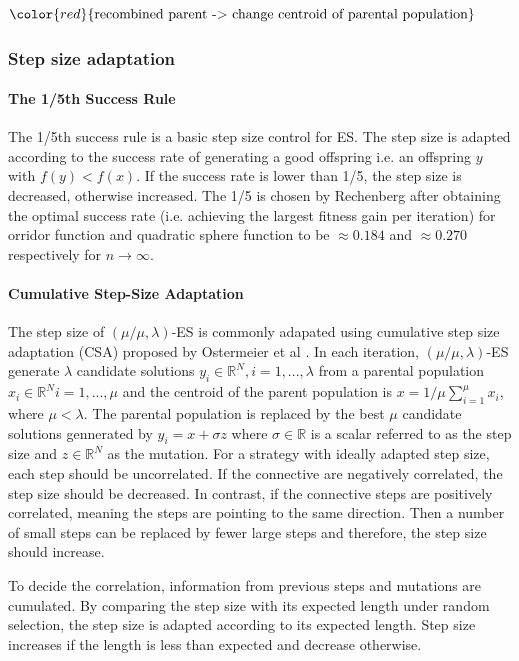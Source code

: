 $\color{red}{\text{recombined parent -> change centroid of parental population}}$


\subsubsection{Step size adaptation}\label{sssec:step_size_adaptation}\hfill
\paragraph{The 1/5th Success Rule} 
The 1/5th success rule is a basic step size control for ES. The step size is adapted according to the success rate of generating a good offspring i.e. an offspring $y$ with $f(y)<f(x)$. If the success rate is lower than 1/5, the step size is decreased, otherwise increased. The 1/5 is chosen by Rechenberg \cite{Rechenberg1973} after obtaining the optimal success rate (i.e. achieving the largest fitness gain per iteration) for orridor function and quadratic sphere function to be $\approx 0.184$ and $\approx 0.270$ respectively for $n \rightarrow \infty$.  
\paragraph{Cumulative Step-Size Adaptation} 
The step size of $(\mu/\mu,\lambda)$-ES is commonly adapated using cumulative step size adaptation (CSA) proposed by Ostermeier et al \cite{Ostermeier:1994:DAS:1326675.1326679}. In each iteration, $(\mu/\mu,\lambda)$-ES generate $\lambda$ candidate solutions $y_i \in \mathbb{R}^N,i=1,...,\lambda$ from a parental population $x_i \in \mathbb{R}^N i=1,...,\mu$ and the centroid of the parent population is $x = 1/\mu \sum_{i=1}^\mu x_i$, where $\mu < \lambda$. The parental population is replaced by the best $\mu$ candidate solutions gennerated by $y_i = x + \sigma z$ where $\sigma \in \mathbb{R}$ is a scalar referred to as the step size and $z \in \mathbb{R}^N$ as the mutation. For a strategy with ideally adapted step size, each step should be uncorrelated. If the connective are negatively correlated, the step size should be decreased. In contrast, if the connective steps are positively correlated, meaning the steps are pointing to the same direction. Then a number of small steps can be replaced by fewer large steps and therefore, the step size should increase. 

To decide the correlation, information from previous steps and mutations are cumulated. By comparing the step size with its expected length under random selection, the step size is adapted according to its expected length. Step size increases if the length is less than expected and decrease otherwise. 

